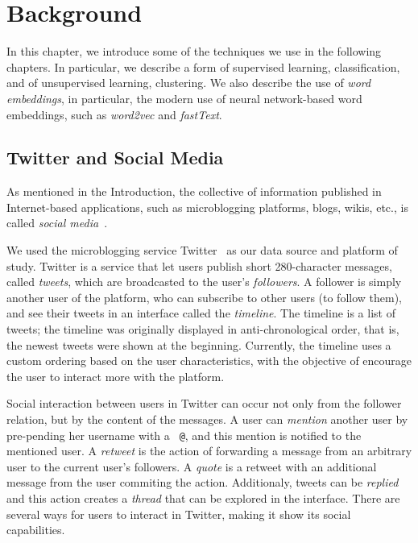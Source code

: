 
\chapter{Background}
\label{chapter:background}

In this chapter, we introduce some of the techniques we use in the following
chapters. 
%
In particular, we describe a form of supervised learning, classification, and of
unsupervised learning, clustering.
%
We also describe the use of {\em word embeddings}, in particular, the modern use
of neural network-based word embeddings, such as {\em word2vec} and {\em
fastText}.

\section{Twitter and Social Media}

As mentioned in the Introduction, the collective of information published in
Internet-based applications, such as microblogging platforms, blogs, wikis,
etc., is called {\em social media}~\cite{kaplan2010users}.

We used the microblogging service Twitter~\cite{twitter} as our data source and
platform of study.
%
Twitter is a service that let users publish short 280-character messages, called
{\em tweets}, which are broadcasted to the user's {\em followers}.
%
A follower is simply another user of the platform, who can subscribe to other
users (to follow them), and see their tweets in an interface called the {\em
timeline}.
%
The timeline is a list of tweets; the timeline was originally displayed in
anti-chronological order, that is, the newest tweets were shown at the
beginning.
%
Currently, the timeline uses a custom ordering based on the user
characteristics, with the objective of encourage the user to interact more with
the platform.

Social interaction between users in Twitter can occur not only from the follower
relation, but by the content of the messages.
%
A user can {\em mention} another user by pre-pending her username with a {\tt
@}, and this mention is notified to the mentioned user.
%
A {\em retweet} is the action of forwarding a message from an arbitrary user to
the current user's followers.
%
A {\em quote} is a retweet with an additional message from the user commiting
the action.
%
Additionaly, tweets can be {\em replied} and this action creates a {\em thread}
that can be explored in the interface.
%
There are several ways for users to interact in Twitter, making it show its
social capabilities.



